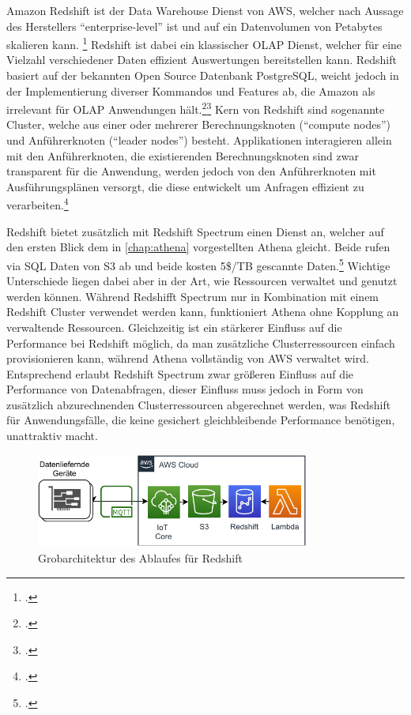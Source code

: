 Amazon Redshift ist der Data Warehouse Dienst von \ac{AWS}, welcher nach Aussage des Herstellers \enquote{enterprise-level} ist und auf ein Datenvolumen von Petabytes skalieren kann. \footcite[Vgl.][1]{AmazonWebServicesInc..o.J.g} Redshift ist dabei ein klassischer \ac{OLAP} Dienst, welcher für eine Vielzahl verschiedener Daten effizient Auswertungen bereitstellen kann. Redshift basiert auf der bekannten Open Source Datenbank PostgreSQL, weicht jedoch in der Implementierung diverser Kommandos und Features ab, die Amazon als irrelevant für \ac{OLAP} Anwendungen hält.\footcite[Vgl.][4]{AmazonWebServicesInc..o.J.g}\nzitat\footcite[Vgl.][428\psqq]{AmazonWebServicesInc..o.J.g} Kern von Redshift sind sogenannte Cluster, welche aus einer oder mehrerer Berechnungsknoten (\enquote{compute nodes}) und Anführerknoten (\enquote{leader nodes}) besteht. Applikationen interagieren allein mit den Anführerknoten, die existierenden Berechnungsknoten sind zwar transparent für die Anwendung, werden jedoch von den Anführerknoten mit Ausführungsplänen versorgt, die diese entwickelt um Anfragen effizient zu verarbeiten.\footcite[Vgl.][4]{AmazonWebServicesInc..o.J.g}

Redshift bietet zusätzlich mit Redshift Spectrum einen Dienst an, welcher auf den ersten Blick dem in \autoref{chap:athena} vorgestellten Athena gleicht. Beide rufen via \ac{SQL} Daten von \ac{S3} ab und beide kosten 5\$/TB gescannte Daten.\footcite[Vgl. auch im Folgenden][]{Smallcombe.2020} Wichtige Unterschiede liegen dabei aber in der Art, wie Ressourcen verwaltet und genutzt werden können. Während Redshifft Spectrum nur in Kombination mit einem Redshift Cluster verwendet werden kann, funktioniert Athena ohne Kopplung an verwaltende Ressourcen. Gleichzeitig ist ein stärkerer Einfluss auf die Performance bei Redshift möglich, da man zusätzliche Clusterressourcen einfach provisionieren kann, während Athena vollständig von \ac{AWS} verwaltet wird. Entsprechend erlaubt Redshift Spectrum zwar größeren Einfluss auf die Performance von Datenabfragen, dieser Einfluss muss jedoch in Form von zusätzlich abzurechnenden Clusterressourcen abgerechnet werden, was Redshift für Anwendungsfälle, die keine gesichert gleichbleibende Performance benötigen, unattraktiv macht.

\begin{figure}[H]
\centering
\includegraphics[width=0.8\textwidth]{graphics/Redshift-general.pdf}
\caption{Grobarchitektur des Ablaufes für Redshift}
\label{abb:GrobArchitekturRedshift}
\end{figure}

